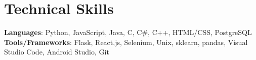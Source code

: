 \documentclass[letterpaper,11pt]{article}
\begin{document}
\section{Technical Skills}
\begin{itemize}[leftmargin=0.15in, label={}]
    \small{\item{
                    \textbf{Languages}{: Python, JavaScript, Java, C, C\#, C++, HTML/CSS, PostgreSQL} \\
                    \textbf{Tools/Frameworks}{: Flask, React.js, Selenium, Unix, sklearn, pandas, Visual Studio Code, Android Studio, Git} \\
              }}
\end{itemize}
\vspace{-16pt}
\end{document}
